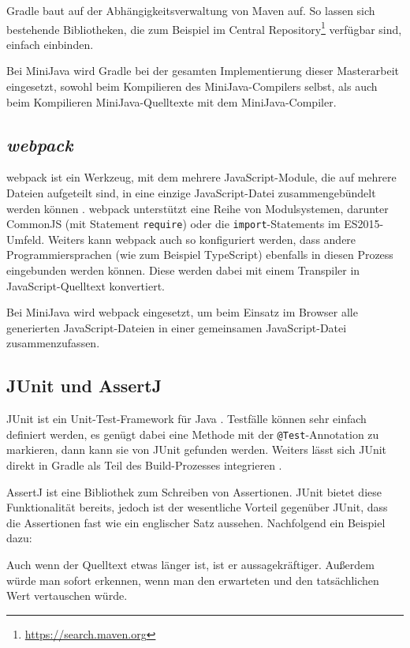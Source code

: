 Gradle baut auf der Abhängigkeitsverwaltung von Maven auf. So lassen sich bestehende Bibliotheken, die zum Beispiel im Central Repository\footnote{\url{https://search.maven.org}} verfügbar sind, einfach einbinden.

Bei MiniJava wird Gradle bei der gesamten Implementierung dieser Masterarbeit eingesetzt, sowohl beim Kompilieren des MiniJava-Compilers selbst, als auch beim Kompilieren MiniJava-Quelltexte mit dem MiniJava-Compiler.

\subsection{\emph{webpack}}
webpack ist ein Werkzeug, mit dem mehrere JavaScript-Module, die auf mehrere Dateien aufgeteilt sind, in eine einzige JavaScript-Datei zusammengebündelt werden können \cite{Webpack}. webpack unterstützt eine Reihe von Modulsystemen, darunter CommonJS (mit Statement \lstinline{require}) oder die \lstinline{import}-Statements im ES2015-Umfeld. Weiters kann webpack auch so konfiguriert werden, dass andere Programmiersprachen (wie zum Beispiel Type\-Script) ebenfalls in diesen Prozess eingebunden werden können. Diese werden dabei mit einem Transpiler in JavaScript-Quelltext konvertiert.

Bei MiniJava wird webpack eingesetzt, um beim Einsatz im Browser alle generierten JavaScript-Dateien in einer gemeinsamen JavaScript-Datei zusammenzufassen.

\subsection{JUnit und AssertJ}
JUnit ist ein Unit-Test-Framework für Java \cite{JUnit}. Testfälle können sehr einfach definiert werden, es genügt dabei eine Methode mit der \lstinline{@Test}-Annotation zu markieren, dann kann sie von JUnit gefunden werden. Weiters lässt sich JUnit direkt in Gradle als Teil des Build-Prozesses integrieren \cite{Gradle}.

AssertJ ist eine Bibliothek zum Schreiben von Assertionen. JUnit bietet diese Funktionalität bereits, jedoch ist der wesentliche Vorteil gegenüber JUnit, dass die Assertionen fast wie ein englischer Satz aussehen. Nachfolgend ein Beispiel dazu:



Auch wenn der Quelltext etwas länger ist, ist er aussagekräftiger. Außerdem würde man sofort erkennen, wenn man den erwarteten und den tatsächlichen Wert vertauschen würde.

